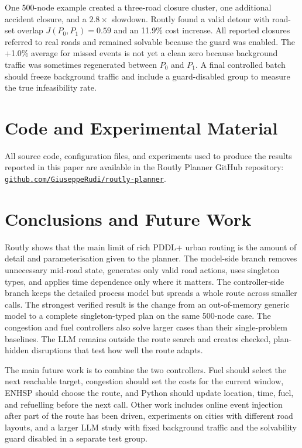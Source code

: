 \documentclass[10pt]{article}
\begin{document}
One 500-node example created a three-road closure cluster, one additional
accident closure, and a $2.8\times$ slowdown. Routly found a valid detour with
road-set overlap $J(P_0,P_1)=0.59$ and an 11.9\% cost increase. All reported
closures referred to real roads and remained solvable because the guard was
enabled. The +1.0\% average for missed events is not yet a clean zero because
background traffic was sometimes regenerated between $P_0$ and $P_1$. A final
controlled batch should freeze background traffic and include a guard-disabled
group to measure the true infeasibility rate.

\section{Code and Experimental Material}
All source code, configuration files, and experiments used to produce the
results reported in this paper are available in the Routly Planner GitHub
repository:
\href{https://github.com/GiuseppeRudi/routly-planner}{\texttt{github.com/GiuseppeRudi/routly-planner}}.

\section{Conclusions and Future Work}
Routly shows that the main limit of rich PDDL+ urban routing is the amount of detail and parameterisation given to the planner. The
model-side branch removes unnecessary mid-road state, generates only valid
road actions, uses singleton types, and applies time dependence only where it
matters. The controller-side branch keeps the detailed process model but spreads a whole route across smaller calls. The strongest verified result is the change
from an out-of-memory generic model to a complete singleton-typed plan on the
same 500-node case. The congestion and fuel controllers also solve larger cases
than their single-problem baselines. The LLM remains outside the route search
and creates checked, plan-hidden disruptions that test how well the route adapts.

The main future work is to combine the two controllers. Fuel should select the
next reachable target, congestion should set the costs for the current window,
ENHSP should choose the route, and Python should update location, time, fuel,
and refuelling before the next call. Other work includes online event injection
after part of the route has been driven, experiments on cities with different
road layouts, and a larger LLM study with fixed background traffic and the
solvability guard disabled in a separate test group.
\end{document}
